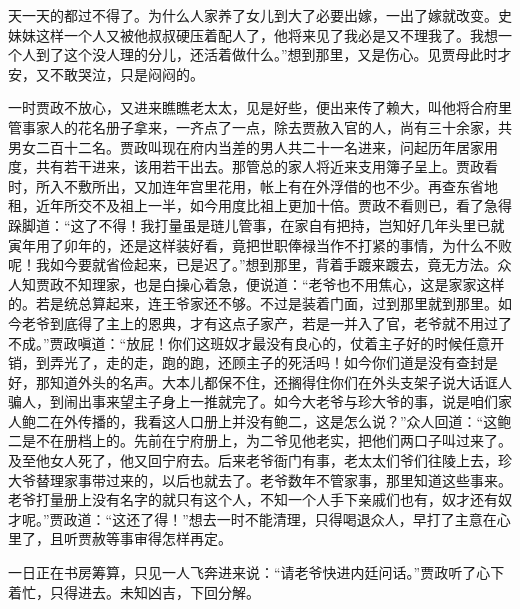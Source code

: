\begin{parag}
天一天的都过不得了。为什么人家养了女儿到大了必要出嫁，一出了嫁就改变。史妹妹这样一个人又被他叔叔硬压着配人了，他将来见了我必是又不理我了。我想一个人到了这个没人理的分儿，还活着做什么。”想到那里，又是伤心。见贾母此时才安，又不敢哭泣，只是闷闷的。
\end{parag}


\begin{parag}
    一时贾政不放心，又进来瞧瞧老太太，见是好些，便出来传了赖大，叫他将合府里管事家人的花名册子拿来，一齐点了一点，除去贾赦入官的人，尚有三十余家，共男女二百十二名。贾政叫现在府内当差的男人共二十一名进来，问起历年居家用度，共有若干进来，该用若干出去。那管总的家人将近来支用簿子呈上。贾政看时，所入不敷所出，又加连年宫里花用，帐上有在外浮借的也不少。再查东省地租，近年所交不及祖上一半，如今用度比祖上更加十倍。贾政不看则已，看了急得跺脚道：“这了不得！我打量虽是琏儿管事，在家自有把持，岂知好几年头里已就寅年用了卯年的，还是这样装好看，竟把世职俸禄当作不打紧的事情，为什么不败呢！我如今要就省俭起来，已是迟了。”想到那里，背着手踱来踱去，竟无方法。众人知贾政不知理家，也是白操心着急，便说道：“老爷也不用焦心，这是家家这样的。若是统总算起来，连王爷家还不够。不过是装着门面，过到那里就到那里。如今老爷到底得了主上的恩典，才有这点子家产，若是一并入了官，老爷就不用过了不成。”贾政嗔道：“放屁！你们这班奴才最没有良心的，仗着主子好的时候任意开销，到弄光了，走的走，跑的跑，还顾主子的死活吗！如今你们道是没有查封是好，那知道外头的名声。大本儿都保不住，还搁得住你们在外头支架子说大话诓人骗人，到闹出事来望主子身上一推就完了。如今大老爷与珍大爷的事，说是咱们家人鲍二在外传播的，我看这人口册上并没有鲍二，这是怎么说？”众人回道：“这鲍二是不在册档上的。先前在宁府册上，为二爷见他老实，把他们两口子叫过来了。及至他女人死了，他又回宁府去。后来老爷衙门有事，老太太们爷们往陵上去，珍大爷替理家事带过来的，以后也就去了。老爷数年不管家事，那里知道这些事来。老爷打量册上没有名字的就只有这个人，不知一个人手下亲戚们也有，奴才还有奴才呢。”贾政道：“这还了得！”想去一时不能清理，只得喝退众人，早打了主意在心里了，且听贾赦等事审得怎样再定。
\end{parag}


\begin{parag}
    一日正在书房筹算，只见一人飞奔进来说：“请老爷快进内廷问话。”贾政听了心下着忙，只得进去。未知凶吉，下回分解。
\end{parag}
